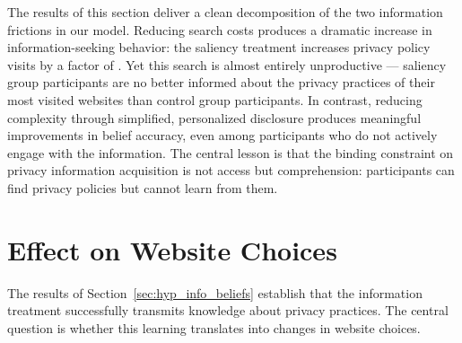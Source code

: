 \documentclass[12pt]{article}
\theoremstyle{definition}
\theoremstyle{remark}
\begin{document}
\medskip\medskip
 
\noindent The results of this section deliver a clean decomposition of the two information frictions in our model. Reducing search costs produces a dramatic increase in information-seeking behavior: the saliency treatment increases privacy policy visits by a factor of \policyVisitSaliencyFold{}. Yet this search is almost entirely unproductive --- saliency group participants are no better informed about the privacy practices of their most visited websites than control group participants. In contrast, reducing complexity through simplified, personalized disclosure produces meaningful improvements in belief accuracy, even among participants who do not actively engage with the information. The central lesson is that the binding constraint on privacy information acquisition is not access but comprehension: participants can find privacy policies but cannot learn from them.

\section{Effect on Website Choices}\label{sec:website_choice}

The results of Section~\ref{sec:hyp_info_beliefs} establish that the information treatment successfully transmits knowledge about privacy practices. The central question is whether this learning translates into changes in website choices. 
\end{document}
